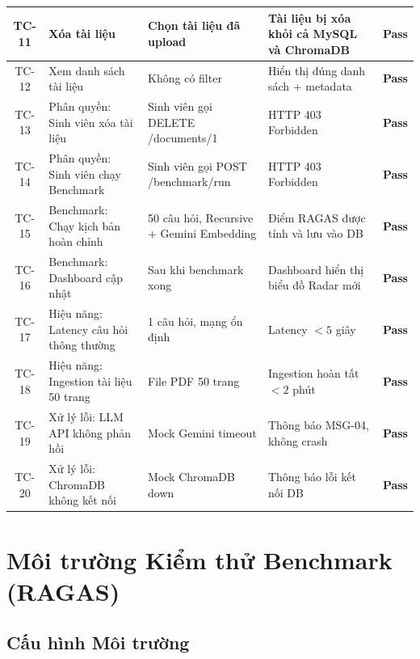 \begin{longtable}{|c|p{3.5cm}|p{3cm}|p{3cm}|c|}
  \hline
  TC-11 & Xóa tài liệu & Chọn tài liệu đã upload & Tài liệu bị xóa khỏi cả MySQL và ChromaDB & \textcolor{green!60!black}{\textbf{Pass}} \\
  \hline
  TC-12 & Xem danh sách tài liệu & Không có filter & Hiển thị đúng danh sách + metadata & \textcolor{green!60!black}{\textbf{Pass}} \\
  \hline
  TC-13 & Phân quyền: Sinh viên xóa tài liệu & Sinh viên gọi DELETE /documents/1 & HTTP 403 Forbidden & \textcolor{green!60!black}{\textbf{Pass}} \\
  \hline
  TC-14 & Phân quyền: Sinh viên chạy Benchmark & Sinh viên gọi POST /benchmark/run & HTTP 403 Forbidden & \textcolor{green!60!black}{\textbf{Pass}} \\
  \hline
  TC-15 & Benchmark: Chạy kịch bản hoàn chỉnh & 50 câu hỏi, Recursive + Gemini Embedding & Điểm RAGAS được tính và lưu vào DB & \textcolor{green!60!black}{\textbf{Pass}} \\
  \hline
  TC-16 & Benchmark: Dashboard cập nhật & Sau khi benchmark xong & Dashboard hiển thị biểu đồ Radar mới & \textcolor{green!60!black}{\textbf{Pass}} \\
  \hline
  TC-17 & Hiệu năng: Latency câu hỏi thông thường & 1 câu hỏi, mạng ổn định & Latency $< 5$ giây & \textcolor{green!60!black}{\textbf{Pass}} \\
  \hline
  TC-18 & Hiệu năng: Ingestion tài liệu 50 trang & File PDF 50 trang & Ingestion hoàn tất $< 2$ phút & \textcolor{green!60!black}{\textbf{Pass}} \\
  \hline
  TC-19 & Xử lý lỗi: LLM API không phản hồi & Mock Gemini timeout & Thông báo MSG-04, không crash & \textcolor{green!60!black}{\textbf{Pass}} \\
  \hline
  TC-20 & Xử lý lỗi: ChromaDB không kết nối & Mock ChromaDB down & Thông báo lỗi kết nối DB & \textcolor{green!60!black}{\textbf{Pass}} \\
  \hline
\end{longtable}

\section{Môi trường Kiểm thử Benchmark (RAGAS)}

\subsection{Cấu hình Môi trường}

